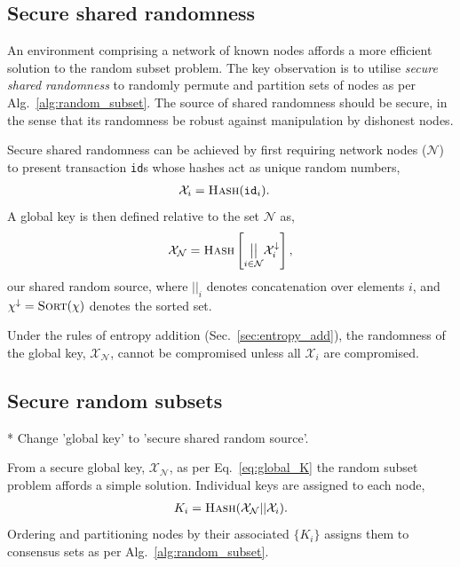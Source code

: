 \subsection{Secure shared randomness} \label{sec:secure_shared_randomness}

An environment comprising a network of known nodes affords a more efficient solution to the random subset problem. The key observation is to utilise  \emph{secure shared randomness} to randomly permute and partition sets of nodes as per Alg.~\ref{alg:random_subset}. The source of shared randomness should be secure, in the sense that its randomness be robust against manipulation by dishonest nodes.

Secure shared randomness can be achieved by first requiring network nodes ($\mathcal{N}$) to present transaction \texttt{id}s whose hashes act as unique random numbers,
\begin{align}
	\mathcal{X}_i &= \textsc{Hash}(\mathtt{id}_i).\end{align}
A global key is then defined relative to the set $\mathcal{N}$ as,
\begin{align} \label{eq:global_K}
	\mathcal{X}_\mathcal{N} = \textsc{Hash}\left[\underset{i\in\mathcal{N}}{\big{|}\big{|}} \mathcal{X}^{\downarrow}_i\right],
\end{align}
our shared random source, where ${||}_i$ denotes concatenation over elements $i$, and \mbox{$\chi^{\downarrow}=\textsc{Sort}(\chi)$} denotes the sorted set.

Under the rules of entropy addition (Sec.~\ref{sec:entropy_add}), the randomness of the global key, $\mathcal{X}_\mathcal{N}$, cannot be compromised unless all $\mathcal{X}_i$ are compromised.

\subsection{Secure random subsets} \label{sec:hash_based_random_subsets}

* Change 'global key' to 'secure shared random source'.

From a secure global key, $\mathcal{X}_\mathcal{N}$, as per Eq.~\eqref{eq:global_K} the random subset problem affords a simple solution. Individual keys are assigned to each node,
\begin{align}
	K_i = \textsc{Hash}(\mathcal{X}_\mathcal{N} || \mathcal{X}_i).
\end{align}
Ordering and partitioning nodes by their associated $\{K_i\}$ assigns them to consensus sets as per Alg.~\ref{alg:random_subset}.

